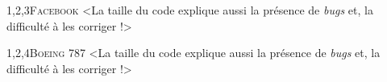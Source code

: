 \begin{quiz}[title={{\itshape Bugs} et bogues}]
\begin{quizquestion*}[b]{4}{1,2,3}{{\scshape Facebook}}
<La taille du code explique aussi la présence de \textit{bugs} et, la difficulté à les corriger !>
\end{quizquestion*}

\begin{quizquestion*}[b]{3}{1,2,4}{{\scshape Boeing 787}}
<La taille du code explique aussi la présence de \textit{bugs} et, la difficulté à les corriger !>
\end{quizquestion*}
\end{quiz}

